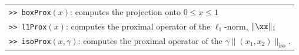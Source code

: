 \documentclass[12pt]{article}
\begin{document}
 \begin{center}
   \begin{tabular}{l}
   \texttt{>> boxProx$(x)$}: computes the projection onto $0 \le x \le 1$\\
   \texttt{>> l1Prox$(x)$}: computes the proximal operator of the $\ell_1$-norm, $\|\xx\|_1$\\
   \texttt{>> isoProx$(x, \gamma)$}: computes the proximal operator of the $\gamma \|(x_1, x_2)\|_\text{iso}.$
\end{tabular}
\end{center}


\newpage
\end{document}
